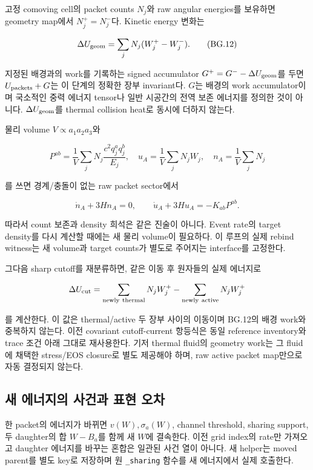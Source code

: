 고정 comoving cell의 packet counts \(N_j\)와 raw angular energies를 보유하면 geometry map에서 \(N_j^+=N_j^-\)다. Kinetic energy 변화는

\[\Delta U_{\rm geom}=\sum_jN_j(W_j^+-W_j^-).\tag{BG.12}\]

지정된 배경과의 work를 기록하는 signed accumulator \(G^+=G^- -\Delta U_{\rm geom}\)를 두면 \(U_{\rm packets}+G\)는 이 단계의 정확한 장부 invariant다. \(G\)는 배경의 work accumulator이며 국소적인 중력 에너지 tensor나 일반 시공간의 전역 보존 에너지를 정의한 것이 아니다. \(\Delta U_{\rm geom}\)를 thermal collision heat로 동시에 더하지 않는다.

물리 volume \(V\propto a_1a_2a_3\)와

\[P^{ab}=\frac1V\sum_jN_j\frac{c^2q_j^aq_j^b}{E_j},\quad u_A=\frac1V\sum_jN_jW_j,\quad n_A=\frac1V\sum_jN_j\tag{BG.13}\]

를 쓰면 경계/충돌이 없는 raw packet sector에서

\[\dot n_A+3Hn_A=0,\qquad\dot u_A+3Hu_A=-K_{ab}P^{ab}.\tag{BG.14}\]

따라서 count 보존과 density 희석은 같은 진술이 아니다. Event rate의 target density를 다시 계산할 때에는 새 물리 volume이 필요하다. 이 루프의 실제 rebind witness는 새 volume과 target counts가 별도로 주어지는 interface를 고정한다.

그다음 sharp cutoff를 재분류하면, 같은 이동 후 원자들의 실제 에너지로

\[\Delta U_{\rm cut}=\sum_{\rm newly\ thermal}N_jW_j^+-\sum_{\rm newly\ active}N_jW_j^+\]

를 계산한다. 이 값은 thermal/active 두 장부 사이의 이동이며 BG.12의 배경 work와 중복하지 않는다. 이전 covariant cutoff-current 항등식은 동일 reference inventory와 trace 조건 아래 그대로 재사용한다. 기저 thermal fluid의 geometry work는 그 fluid에 채택한 stress/EOS closure로 별도 제공해야 하며, raw active packet map만으로 자동 결정되지 않는다.

\hypertarget{uxc0c8-uxc5d0uxb108uxc9c0uxc758-uxc0acuxac74uxacfc-uxd45cuxd604-uxc624uxcc28}{%
\subsection{새 에너지의 사건과 표현 오차}\label{uxc0c8-uxc5d0uxb108uxc9c0uxc758-uxc0acuxac74uxacfc-uxd45cuxd604-uxc624uxcc28}}

한 packet의 에너지가 바뀌면 \(v(W),\sigma_a(W)\), channel threshold, sharing support, 두 daughter의 합 \(W-B_a\)를 함께 새 \(W\)에 결속한다. 이전 grid index의 rate만 가져오고 daughter 에너지를 바꾸는 혼합은 일관된 사건 열이 아니다. 새 helper는 moved parent를 별도 key로 저장하며 원 \texttt{\_sharing} 함수를 새 에너지에서 실제 호출한다.

